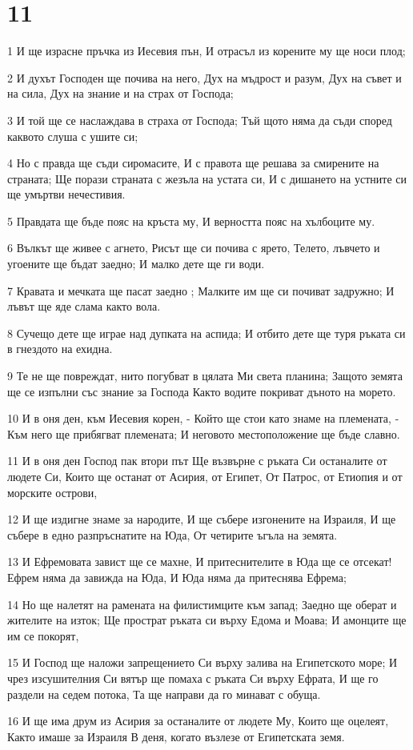 \chapter{11}

\par 1 И ще израсне пръчка из Иесевия пън, И отрасъл из корените му ще носи плод;
\par 2 И духът Господен ще почива на него, Дух на мъдрост и разум, Дух на съвет и на сила, Дух на знание и на страх от Господа;
\par 3 И той ще се наслаждава в страха от Господа; Тъй щото няма да съди според каквото слуша с ушите си;
\par 4 Но с правда ще съди сиромасите, И с правота ще решава за смирените на страната; Ще порази страната с жезъла на устата си, И с дишането на устните си ще умъртви нечестивия.
\par 5 Правдата ще бъде пояс на кръста му, И верността пояс на хълбоците му.
\par 6 Вълкът ще живее с агнето, Рисът ще си почива с ярето, Телето, лъвчето и угоените ще бъдат заедно; И малко дете ще ги води.
\par 7 Кравата и мечката ще пасат заедно ; Малките им ще си почиват задружно; И лъвът ще яде слама както вола.
\par 8 Сучещо дете ще играе над дупката на аспида; И отбито дете ще туря ръката си в гнездото на ехидна.
\par 9 Те не ще повреждат, нито погубват в цялата Ми света планина; Защото земята ще се изпълни със знание за Господа Както водите покриват дъното на морето.
\par 10 И в оня ден, към Иесевия корен, - Който ще стои като знаме на племената, - Към него ще прибягват племената; И неговото местоположение ще бъде славно.
\par 11 И в оня ден Господ пак втори път Ще възвърне с ръката Си останалите от людете Си, Които ще останат от Асирия, от Египет, От Патрос, от Етиопия и от морските острови,
\par 12 И ще издигне знаме за народите, И ще събере изгонените на Израиля, И ще събере в едно разпръснатите на Юда, От четирите ъгъла на земята.
\par 13 И Ефремовата завист ще се махне, И притеснителите в Юда ще се отсекат! Ефрем няма да завижда на Юда, И Юда няма да притеснява Ефрема;
\par 14 Но ще налетят на рамената на филистимците към запад; Заедно ще оберат и жителите на изток; Ще прострат ръката си върху Едома и Моава; И амонците ще им се покорят,
\par 15 И Господ ще наложи запрещението Си върху залива на Египетското море; И чрез изсушителния Си вятър ще помаха с ръката Си върху Ефрата, И ще го раздели на седем потока, Та ще направи да го минават с обуща.
\par 16 И ще има друм из Асирия за останалите от людете Му, Които ще оцелеят, Както имаше за Израиля В деня, когато възлезе от Египетската земя.


